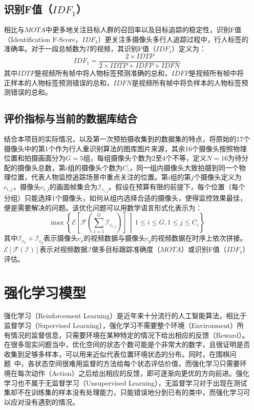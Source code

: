 \subsection{识别F值（$\mathit{IDF_1}$）}

相比与$\mathit{MOTA}$中更多地关注目标人群的召回率以及目标追踪的稳定性，识别F值（Identification F-Score，$\mathit{IDF_1}$）更关注多摄像头多行人追踪过程中，行人标签的准确率。对于一段总帧数为$T$的视频，其识别F值（$\mathit{IDF_1}$）定义为：
\begin{equation}
\mathit{IDF_1}=\frac{2\times\mathit{IDTP}}{2\times\mathit{IDTP}+\mathit{IDFP}+\mathit{IDFN}}
\end{equation}
其中$\mathit{IDTP}$是视频所有帧中将人物标签预测准确的总和，$\mathit{IDFP}$是视频所有帧中将正样本的人物标签预测错误的总和，$\mathit{IDFN}$是视频所有帧中将负样本的人物标签预测错误的总和。

\subsection{评价指标与当前的数据库结合}

结合本项目的实际情况，以及第一次预拍摄收集到的数据集的特点，将原始的17个摄像头中的第1个作为行人重识别算法的图库图片来源，其余16个摄像头按照物理位置和拍摄画面分为$G=5$组，每组摄像头个数为2至4个不等，定义$N=16$为待分配的摄像头总数，第$i$组的摄像头个数为$C_i$，同一组内摄像头大致拍摄到同一个物理位置，代表人物监控追踪场景中重点关注的位置。第$i$组的第$j$个摄像头定义为$c_{i,j}$，摄像头$c_{i,j}$的画面帧集合为$\mathcal{I}_{c_{i,j}}$。假设在预算有限的前提下，每个位置（每个分组）只能选择1个摄像头，如何从组内选择合适的摄像头，使得监控效果最佳，便是需要解决的问题。该优化问题可以用数学语言形式化表示为：
\begin{equation}
\max \left\{\mathcal{E}\left[\mathcal{F}\left(\sum_{i=1}^G \mathcal{I}_{c_{i,j}}\right)\right]\,\middle\vert\, 1\leq i \leq G, 1\leq j \leq C_i\right\}
\end{equation}
其中$\mathcal{I}_{c_x}+\mathcal{I}_{c_y}$表示摄像头$c_x$的视频数据与摄像头$c_y$的视频数据在时序上依次拼接。$\mathcal{E}[\mathcal{F}(\mathcal{I})]$表示对视频数据$\mathcal{I}$做多目标跟踪准确度（$\mathit{MOTA}$）或识别F值（$\mathit{IDF_1}$）评估。

\section{强化学习模型}

强化学习（Reinforcement Learning）是近年来十分流行的人工智能算法，相比于监督学习（Supervised Learning），强化学习不需要整个环境（Environment）所有情况的监督信息，只需要环境在某种特定的情况下给出相应的反馈（Reward）。在很多现实问题当中，优化空间的状态个数可能是个非常大的数字，且很证明是否收集到足够多样本，可以用来近似代表位置环境状态的分布。同时，在围棋问题~\cite{silver2016mastering}中，各状态空间很难用监督的方法给每个状态评估价值，而强化学习只需要环境在每次动作（Action）之后给出相应的反馈，即可逐渐向更优的方向前进。强化学习也不属于无监督学习（Unsupervised Learning），无监督学习对于出现在测试集却不在训练集的样本没有处理能力，只能错误地分到已有的类中，而强化学习可以应对没有遇到的情况。

